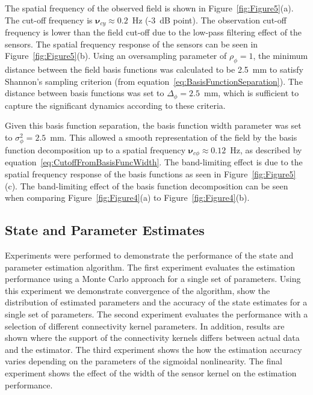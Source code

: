 \documentclass[12pt]{iopart}
\begin{document}
The spatial frequency of the observed field is shown in Figure~\ref{fig:Figure5}(a). The cut-off frequency is $\boldsymbol{\nu}_{cy} \approx 0.2$~Hz (-3~dB point). The observation cut-off frequency is lower than the field cut-off due to the low-pass filtering effect of the sensors. The spatial frequency response of the sensors can be seen in Figure~\ref{fig:Figure5}(b). Using an oversampling parameter of $\rho_{\phi}=1$, the minimum distance between the field basis functions was calculated to be 2.5~mm to satisfy Shannon's sampling criterion (from equation~\ref{eq:BasisFunctionSeparation}). The distance between basis functions was set to $\Delta_{\phi}=2.5$~mm, which is sufficient to capture the significant dynamics according to these criteria.

Given this basis function separation, the basis function width parameter was set to $\sigma_{\phi}^2=2.5$~mm. This allowed a smooth representation of the field by the basis function decomposition up to a spatial frequency $\boldsymbol{\nu}_{c\phi} \approx 0.12$~Hz, as described by equation~\ref{eq:CutoffFromBasisFuncWidth}. The band-limiting effect is due to the spatial frequency response of the basis functions as seen in Figure~\ref{fig:Figure5}(c). The band-limiting effect of the basis function decomposition can be seen when comparing Figure~\ref{fig:Figure4}(a) to Figure~\ref{fig:Figure4}(b).

\subsection{State and Parameter Estimates} 
\label{sec:state_and_param_results}
Experiments were performed to demonstrate the performance of the state and parameter estimation algorithm. The first experiment evaluates the estimation performance using a Monte Carlo approach for a single set of parameters. Using this experiment we demonstrate convergence of the algorithm, show the distribution of estimated parameters and the accuracy of the state estimates for a single set of parameters. The second experiment evaluates the performance with a selection of different connectivity kernel parameters. In addition, results are shown where the support of the connectivity kernels differs between actual data and the estimator. The third experiment shows the how the estimation accuracy varies depending on the parameters of the sigmoidal nonlinearity. The final experiment shows the effect of the width of the sensor kernel on the estimation performance.
\end{document}
